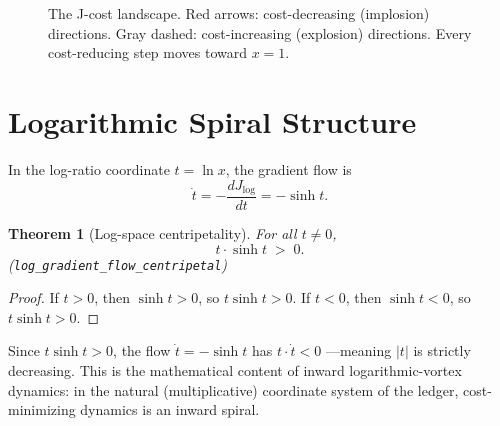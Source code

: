 \documentclass[11pt,a4paper]{article}
\newtheorem{theorem}{Theorem}[section]
\theoremstyle{definition}
\newcommand{\Jc}{J}
\newcommand{\code}[1]{\texttt{\small #1}}
\begin{document}
\begin{figure}[ht]
\centering
{}
\caption{The J-cost landscape.  Red arrows: cost-decreasing (implosion)
  directions.  Gray dashed: cost-increasing (explosion) directions.
  Every cost-reducing step moves toward $x=1$.}
\label{fig:Jcost}
\end{figure}

\section{Logarithmic Spiral Structure}
\label{sec:spiral}

In the log-ratio coordinate $t = \ln x$, the gradient flow is
\begin{equation}
  \dot t = -\frac{d\Jc_{\log}}{dt} = -\sinh t.
\end{equation}

\begin{theorem}[Log-space centripetality]\label{thm:log-centripetal}
For all $t \ne 0$,
\begin{equation}
  t \cdot \sinh t \;>\; 0.
\end{equation}
\textup{(\code{log\_gradient\_flow\_centripetal})}
\end{theorem}

\begin{proof}
If $t > 0$, then $\sinh t > 0$, so $t \sinh t > 0$.
If $t < 0$, then $\sinh t < 0$, so $t \sinh t > 0$.
\end{proof}

Since $t \sinh t > 0$, the flow $\dot t = -\sinh t$ has $t \cdot \dot t < 0$
---meaning $|t|$ is strictly decreasing.  This is the mathematical content of
inward logarithmic-vortex dynamics: in the natural (multiplicative)
coordinate system of the ledger, cost-minimizing dynamics is an inward spiral.
\end{document}
